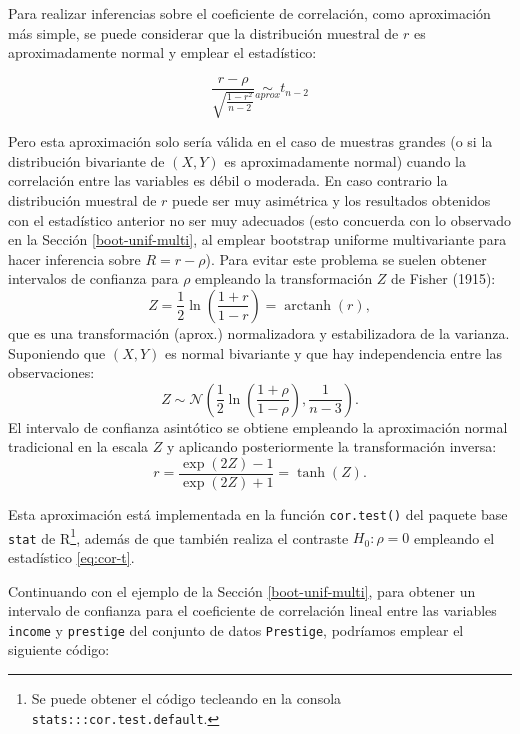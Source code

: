 \documentclass[
]{book}
\newenvironment{Shaded}{\begin{snugshade}}{\end{snugshade}}
\newcommand{\AttributeTok}[1]{\textcolor[rgb]{0.13,0.29,0.53}{#1}}
\newcommand{\CommentTok}[1]{\textcolor[rgb]{0.56,0.35,0.01}{\textit{#1}}}
\newcommand{\FunctionTok}[1]{\textcolor[rgb]{0.13,0.29,0.53}{\textbf{#1}}}
\newcommand{\NormalTok}[1]{#1}
\newcommand{\SpecialCharTok}[1]{\textcolor[rgb]{0.81,0.36,0.00}{\textbf{#1}}}
\newcommand{\StringTok}[1]{\textcolor[rgb]{0.31,0.60,0.02}{#1}}
\theoremstyle{break}
\theoremstyle{nonumberplain}
\renewcommand{\CommentTok}[1]{\textcolor[rgb]{0.41,0.41,0.41}{\texttt{#1}}}
\let\oldfootnote\footnote
\renewcommand\footnote[1]{\oldfootnote{\hspace{2mm}#1}}
\begin{document}
Para realizar inferencias sobre el coeficiente de correlación, como aproximación más simple, se puede considerar que la distribución muestral de \(r\) es aproximadamente normal y emplear el estadístico:

\begin{equation} 
\frac{r -\rho}{\sqrt{\frac{1 - r^2}{n - 2}}} \underset{aprox}{\sim } t_{n-2}
\label{eq:cor-t}
\end{equation}

Pero esta aproximación solo sería válida en el caso de muestras grandes (o si la distribución bivariante de \((X, Y)\) es aproximadamente normal) cuando la correlación entre las variables es débil o moderada.
En caso contrario la distribución muestral de \(r\) puede ser muy asimétrica y los resultados obtenidos con el estadístico anterior no ser muy adecuados (esto concuerda con lo observado en la Sección \ref{boot-unif-multi}, al emplear bootstrap uniforme multivariante para hacer inferencia sobre \(R = r -\rho\)).
Para evitar este problema se suelen obtener intervalos de confianza para \(\rho\) empleando la transformación \(Z\) de Fisher (1915):
\[Z = \frac{1}{2}\ln \left( \frac{1+r}{1-r} \right) = \operatorname{arctanh}(r),\]
que es una transformación (aprox.) normalizadora y estabilizadora de la varianza.
Suponiendo que \((X, Y)\) es normal bivariante y que hay independencia entre las observaciones:
\[Z \sim \mathcal{N}\left( \frac{1}{2}\ln \left( \frac{1+\rho}{1-\rho} \right), \frac{1}{n-3} \right).\]
El intervalo de confianza asintótico se obtiene empleando la aproximación normal tradicional en la escala \(Z\) y aplicando posteriormente la transformación inversa:
\[r = \frac{\exp(2Z)-1}{\exp(2Z)+1} = \operatorname{tanh}(Z).\]

Esta aproximación está implementada en la función \texttt{cor.test()} del paquete base \texttt{stat} de R\footnote{Se puede obtener el código tecleando en la consola \texttt{stats:::cor.test.default}.}, además de que también realiza el contraste \(H_0: \rho = 0\) empleando el estadístico \eqref{eq:cor-t}.

Continuando con el ejemplo de la Sección \ref{boot-unif-multi}, para obtener un intervalo de confianza para el coeficiente de correlación lineal entre las variables \texttt{income} y \texttt{prestige} del conjunto de datos \texttt{Prestige}, podríamos emplear el siguiente código:

\begin{Shaded}
\end{Shaded}
\end{document}
